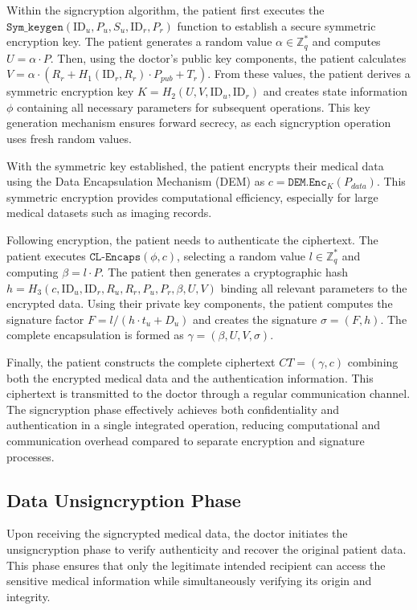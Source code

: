 \documentclass[10pt]{article}
\begin{document}
Within the signcryption algorithm, the patient first executes the $\texttt{Sym\_keygen}(\text{ID}_u, P_u, S_u, \text{ID}_r, P_r)$ function to establish a secure symmetric encryption key. The patient generates a random value $\alpha \in \mathbb{Z}_q^*$ and computes $U = \alpha \cdot P$. Then, using the doctor's public key components, the patient calculates $V = \alpha \cdot (R_r + H_1(\text{ID}_r, R_r) \cdot P_{pub} + T_r)$. From these values, the patient derives a symmetric encryption key $K = H_2(U, V, \text{ID}_u, \text{ID}_r)$ and creates state information $\phi$ containing all necessary parameters for subsequent operations. This key generation mechanism ensures forward secrecy, as each signcryption operation uses fresh random values.

With the symmetric key established, the patient encrypts their medical data using the Data Encapsulation Mechanism (DEM) as $c = \texttt{DEM.Enc}_K(P_{data})$. This symmetric encryption provides computational efficiency, especially for large medical datasets such as imaging records.

Following encryption, the patient needs to authenticate the ciphertext. The patient executes $\texttt{CL-Encaps}(\phi, c)$, selecting a random value $l \in \mathbb{Z}_q^*$ and computing $\beta = l \cdot P$. The patient then generates a cryptographic hash $h = H_3(c, \text{ID}_u, \text{ID}_r, R_u, R_r, P_u, P_r, \beta, U, V)$ binding all relevant parameters to the encrypted data. Using their private key components, the patient computes the signature factor $F = l/(h \cdot t_u + D_u)$ and creates the signature $\sigma = (F, h)$. The complete encapsulation is formed as $\gamma = (\beta, U, V, \sigma)$.

Finally, the patient constructs the complete ciphertext $CT = (\gamma, c)$ combining both the encrypted medical data and the authentication information. This ciphertext is transmitted to the doctor through a regular communication channel. The signcryption phase effectively achieves both confidentiality and authentication in a single integrated operation, reducing computational and communication overhead compared to separate encryption and signature processes.

\subsection{Data Unsigncryption Phase}
Upon receiving the signcrypted medical data, the doctor initiates the unsigncryption phase to verify authenticity and recover the original patient data. This phase ensures that only the legitimate intended recipient can access the sensitive medical information while simultaneously verifying its origin and integrity.
\end{document}
